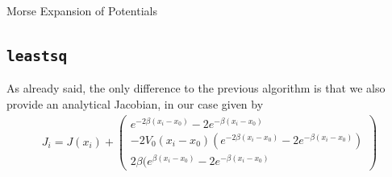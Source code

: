 \begin{chapter}{Morse Expansion of Potentials}
%	
%





\subsection{\texttt{leastsq}}%
\label{subsec:leastsq}
As already said, the only difference to the previous algorithm is that we also provide an analytical Jacobian,
in our case given by
\begin{align}
    J_i=J(x_i)+
    \begin{pmatrix}
    	e^{-2\beta(x_i-x_0)}-2e^{-\beta(x_i-x_0)}\\
	-2 V_0 (x_i-x_0)(e^{-2\beta(x_i-x_0)}-2e^{-\beta(x_i-x_0)})\\
	2\beta(e^{\beta(x_i-x_0)}-2e^{-\beta(x_i-x_0)}
    \end{pmatrix}
\end{align}


\end{chapter}
